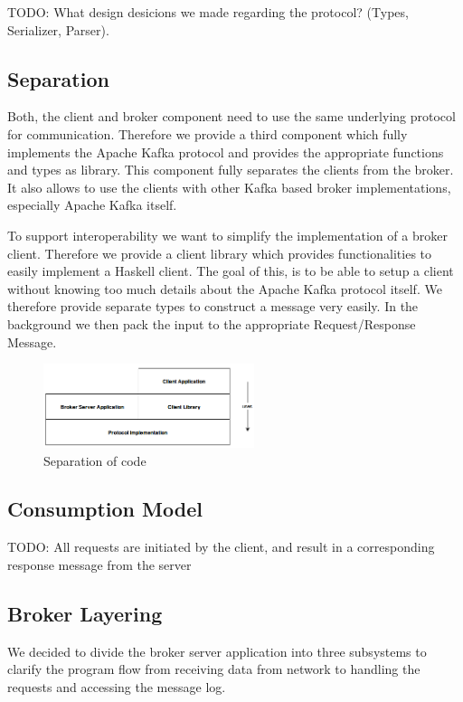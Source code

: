 TODO: What design desicions we made regarding the protocol? (Types, Serializer,
Parser). 

\subsection{Separation} 
Both, the client and broker component need to use the same underlying protocol for
communication. Therefore we provide a third component which fully implements the Apache Kafka
protocol  and provides the appropriate functions and types as library.
This component fully separates the clients from the broker. It also allows to
use the clients with other Kafka based broker implementations, especially Apache
Kafka itself. 

To support interoperability we want to simplify the implementation of a broker
client. Therefore we provide a client library which provides functionalities to
easily implement a Haskell client. The goal of this, is to be able to
setup a client without knowing too much details about the Apache Kafka protocol
itself. We therefore provide separate types to construct a message very easily.
In the background we then pack the input to the appropriate Request/Response
Message. 

\begin{figure}[H]
    \centering
    \includegraphics[width=0.55\textwidth]{images/architecture-components.png}
    \caption{Separation of code}
    \label{fig:architecture-components.png}
\end{figure}

\subsection{Consumption Model}
TODO: All requests are initiated by the client, and result in a corresponding
response message from the server

\subsection{Broker Layering}
We decided to divide the broker server application into three subsystems to
clarify the program flow from receiving data from network to handling the
requests and accessing the message log. 
